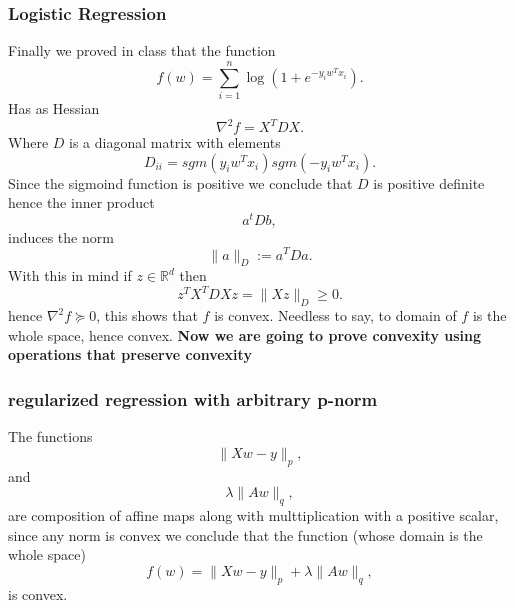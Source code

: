 \documentclass[11pt]{article}
\theoremstyle{plain}
\begin{document}
\subsubsection{Logistic Regression}
Finally we proved in class that the function
\begin{equation*}
f(w)=\sum_{i=1}^{n}\log(1+e^{-y_{i}w^{T}x_{i}}).
\end{equation*}
Has as Hessian
\begin{equation*}
\nabla^{2} f=X^{T}DX.
\end{equation*}
Where $D$ is a diagonal matrix with elements
\begin{equation*}
D_{ii}=sgm(y_{i}w^{T}x_{i})sgm(-y_{i}w^{T}x_{i}).
\end{equation*}
Since the sigmoind function is positive we conclude that $D$ is positive definite hence the inner product
\begin{equation*}
a^{t}Db,
\end{equation*}
induces the norm
\begin{equation*}
\|a\|_{D}:=a^{T}Da.
\end{equation*}
With this in mind if $z\in\mathbb{R}^{d}$ then
\begin{equation*}
z^{T}X^{T}DXz=\|Xz\|_{D}\geq 0.
\end{equation*}
hence $\nabla^{2} f\succeq 0$, this shows that $f$ is convex. Needless to say, to domain of $f$ is the
whole space, hence convex.
\newline
\newline
\textbf{Now we are going to prove convexity using operations that preserve convexity}

\subsubsection{regularized regression with arbitrary p-norm}
The functions
\begin{equation*}
\|Xw-y\|_{p},
\end{equation*}
and
\begin{equation*}
\lambda\|Aw\|_{q},
\end{equation*}
are composition of affine maps along with multtiplication with a positive scalar, since any norm
is convex we conclude that the function (whose domain is the whole space)  
\begin{equation*}
f(w)=\|Xw-y\|_{p}+\lambda\|Aw\|_{q},
\end{equation*}
is convex.
\end{document}
